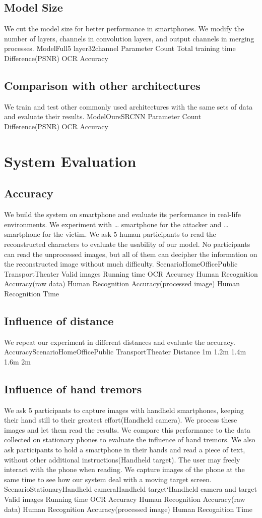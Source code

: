 \subsection{Model Size}
We cut the model size for better performance in smartphones. We modify the number of layers, channels in convolution layers, and output channels in merging processes.
ModelFull5 layer32channel
Parameter Count
Total training time
Difference(PSNR)
OCR Accuracy
\subsection{Comparison with other architectures}
We train and test other commonly used architectures with the same sets of data and evaluate their results.
ModelOursSRCNN
Parameter Count
Difference(PSNR)
OCR Accuracy

\section{System Evaluation}
\subsection{Accuracy}
We build the system on smartphone and evaluate its performance in real-life environments. We experiment with … smartphone for the attacker and … smartphone for the victim. We ask 5 human participants to read the reconstructed characters to evaluate the usability of our model. No participants can read the unprocessed images, but all of them can decipher the information on the reconstructed image without much difficulty.
ScenarioHomeOfficePublic TransportTheater
Valid images
Running time
OCR Accuracy
Human Recognition Accuracy(raw data)
Human Recognition Accuracy(processed image)
Human Recognition Time
\subsection{Influence of distance}
We repeat our experiment in different distances and evaluate the accuracy.
AccuracyScenarioHomeOfficePublic TransportTheater
Distance
1m
1.2m
1.4m
1.6m
2m
\subsection{Influence of hand tremors}
We ask 5 participants to capture images with handheld smartphones, keeping their hand still to their greatest effort(Handheld camera). We process these images and let them read the results. We compare this performance to the data collected on stationary phones to evaluate the influence of hand tremors.
We also ask participants to hold a smartphone in their hands and read a piece of text, without other additional instructions(Handheld target). The user may freely interact with the phone when reading. We capture images of the phone at the same time to see how our system deal with a moving target screen.
ScenarioStationaryHandheld cameraHandheld target‘Handheld camera and target
Valid images
Running time
OCR Accuracy
Human Recognition Accuracy(raw data)
Human Recognition Accuracy(processed image)
Human Recognition Time
